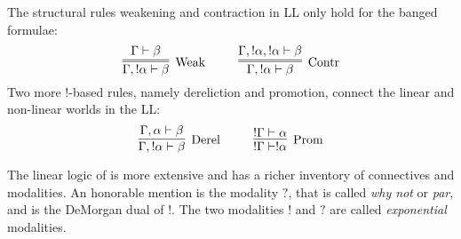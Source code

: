The structural rules weakening and contraction in LL only hold for the banged formulae:
\[
\infer=[\mbox{Weak}]{\Gamma, !\alpha \vdash \beta}{\Gamma \vdash \beta}
~~~~ ~~~~
\infer=[\mbox{Contr}]{\Gamma, !\alpha \vdash \beta}{\Gamma, !\alpha, !\alpha \vdash \beta}
\]
Two more $!$-based rules, namely dereliction and promotion, connect the linear and non-linear worlds in the LL:
\[
\infer[\mbox{Derel}]{\Gamma, !\alpha \vdash \beta}{\Gamma, \alpha \vdash \beta}
~~~~ ~~~~
\infer[\mbox{Prom}]{!\Gamma \vdash !\alpha}{!\Gamma \vdash \alpha}
\]

The linear logic of \cite{DBLP:journals/tcs/Girard87} is more extensive and has a richer inventory of connectives and modalities. An honorable mention is the modality $?$, that is called \textit{why not} or \textit{par}, and is the DeMorgan dual of $!$. The two modalities $!$ and $?$ are called \textit{exponential} modalities.
